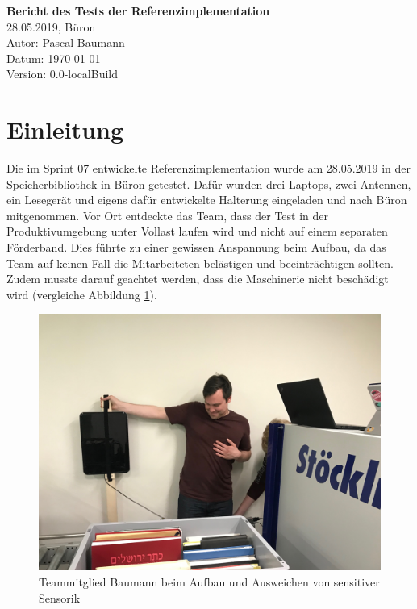 \documentclass[parskip=full, a4paper]{scrartcl}
\providecommand{\docversion}{0.0-localBuild}
\begin{document}
\begin{titlepage}
\vspace*{2.5cm}
\noindent
\Huge{\textbf{Bericht des Tests der Referenzimplementation}} \\
\noindent
\Large{28.05.2019, Büron}\\
\vfill
\noindent
\large{Autor: Pascal Baumann}\\
\noindent
\large{Datum: \today}\\
\noindent
\large{Version: \docversion}\\
\end{titlepage}

\tableofcontents
\clearpage

\section{Einleitung}
Die im Sprint 07 entwickelte Referenzimplementation wurde am 28.05.2019 in der Speicherbibliothek in Büron getestet. Dafür wurden drei Laptops, zwei Antennen, ein Lesegerät und eigens dafür entwickelte Halterung eingeladen und nach Büron mitgenommen. Vor Ort entdeckte das Team, dass der Test in der Produktivumgebung unter Vollast laufen wird und nicht auf einem separaten Förderband. Dies führte zu einer gewissen Anspannung beim Aufbau, da das Team auf keinen Fall die Mitarbeiteten belästigen und beeinträchtigen sollten. Zudem musste darauf geachtet werden, dass die Maschinerie nicht beschädigt wird (vergleiche Abbildung \ref{fig:AufbauSensorik}).

\begin{figure}[htb]
	\centering
	\includegraphics[keepaspectratio,width=\textwidth]{img/Testaufbau.jpg}
	\caption{Teammitglied Baumann beim Aufbau und Ausweichen von sensitiver Sensorik}
	\label{fig:AufbauSensorik}
\end{figure}
\end{document}
